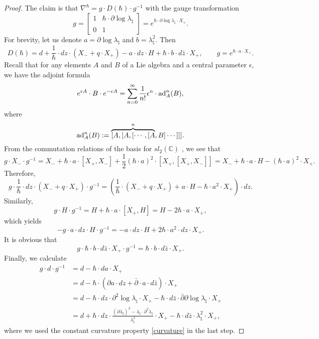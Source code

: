 \documentclass[oneside, 11pt]{amsart}
\theoremstyle{definition}
\numberwithin{equation}{subsection}
\def\lam{\lambda}
\def\ad{{\text{\rm{ad}}}}
\newcommand{\bC}{{\mathbb{C}}}
\newcommand{\half}{{\frac{1}{2}}}
\begin{document}
{\begin{proof}
The claim is that
$\nabla^{\hbar}=g \cdot D(\hbar) \cdot g^{-1}$ 
with the gauge transformation 
$$
g=\begin{bmatrix}
1 & \hbar\cdot \partial \log \lambda_{\natural}\\
0 & 1
\end{bmatrix}
=e^{\hbar \cdot \partial\log\lam_\natural\cdot  X_+}.
$$
For brevity, let us denote $a=\partial \log \lambda_{\natural}$ and $b=\lambda_{\natural}^2$.
Then
$$
D(\hbar) =d+ \frac{1}{\hbar} \cdot dz \cdot
(X_-+q \cdot X_+)-a\cdot dz \cdot H +\hbar \cdot b \cdot d\bar{z} \cdot X_+,
\qquad g =   e^{\hbar \cdot a \cdot X_+}.
$$ 
Recall that for any elements $A$ and $B$ of a Lie 
algebra and a central parameter $\epsilon$, we have 
the adjoint formula
$$
e^{\epsilon A} \cdot B \cdot e^{-\epsilon A}
=\sum_{n=0}^\infty \frac{1}{n!} \epsilon^n \cdot
\ad^n_A (B),
$$
where
$$
\ad^n_A (B): =\overset{n}
{\overbrace{[A,[A,[\cdots,[A}},B]\cdots]]].
$$
From the commutation relations of the basis for
$sl_2(\bC)$ , 
we see that 
$$
g \cdot X_- \cdot g^{-1} = X_- + \hbar \cdot a \cdot [X_+,X_-]
+ \half (\hbar \cdot a)^2 \cdot [X_+,[X_+,X_-]]
=X_-+ \hbar \cdot a \cdot H - (\hbar \cdot a)^2 \cdot X_+.
$$
Therefore, 
$$
g\cdot \frac{1}{\hbar} \cdot dz \cdot
(X_-+q \cdot X_+)\cdot g^{-1}=
 \left(\frac{1}{\hbar}\cdot (X_-+q \cdot X_+)
 +a\cdot H -\hbar \cdot a^2 \cdot X_+
\right)\cdot dz.
$$
Similarly, 
$$
g\cdot H \cdot g^{-1} = H +\hbar\cdot a \cdot [X_+,H]  =H -2\hbar \cdot a \cdot X_+,
$$
which yields
$$
-g\cdot a \cdot dz\cdot H\cdot g^{-1} =- a \cdot dz \cdot H + 2\hbar \cdot a^2 \cdot dz \cdot X_+.
$$
It is obvious that 
$$g\cdot \hbar \cdot b \cdot  d\bar{z} \cdot  X_+\cdot 
g^{-1} = \hbar \cdot b \cdot d\bar{z} \cdot X_+.
$$
Finally, we calculate
\begin{align*}
g\cdot d\cdot g^{-1} &= d -\hbar \cdot da \cdot X_+ 
\\
&=d-\hbar \cdot (\partial a \cdot dz+\bar{\partial} \cdot a \cdot d\bar{z}) \cdot X_+
\\
&= d-\hbar \cdot
dz \cdot \partial^2 \log \lam_\natural \cdot X_+
-\hbar \cdot d\bar{z} \cdot \bar{\partial}\partial \log \lam_\natural \cdot
X_+
\\
&=d +\hbar \cdot dz \cdot \frac{(\partial \lam_\natural)^2 -
\lam_\natural \cdot \partial^2\lam_\natural}{\lam_\natural^2} \cdot X_+
- \hbar \cdot d\bar{z} \cdot \lam_\natural^2 \cdot X_+,
\end{align*}
where we used the constant curvature property
\eqref{curvature} in the last step. 


\end{proof}}
\end{document}
